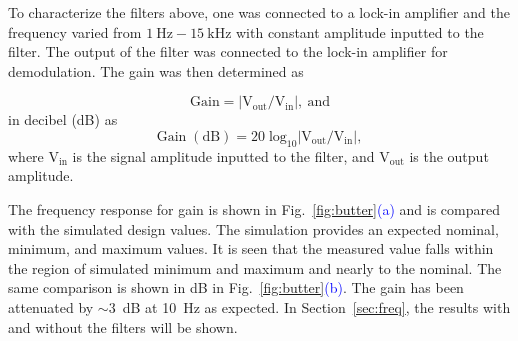 To characterize the filters above, one was connected to a lock-in amplifier and the frequency varied from $\mathrm{1~Hz-15~kHz}$ with constant amplitude inputted to the filter. The output of the filter was connected to the lock-in amplifier for demodulation. The gain was then determined as 

\begin{equation}\label{eq:filter_gain}
    \mathrm{Gain=|V_{out}/V_{in}|,~and}
\end{equation}
in decibel (dB) as
\begin{equation}\label{eq:filter_gain_db}
    \mathrm{Gain\;(dB)=20\;log_{10}|V_{out}/V_{in}|,}
\end{equation}
where $\mathrm{V_{in}}$ is the signal amplitude inputted to the filter, and $\mathrm{V_{out}}$ is the output amplitude.


The frequency response for gain is shown in Fig.~\ref{fig:butter}\textcolor{blue}{(a)} and is compared with the simulated design values. The simulation provides an expected nominal, minimum, and maximum values. It is seen that the measured value falls within the region of simulated minimum and maximum and nearly to the nominal. The same comparison is shown in dB in Fig.~\ref{fig:butter}\textcolor{blue}{(b)}. The gain has been attenuated by $\sim3$~dB at 10~Hz as expected. In Section~\ref{sec:freq}, the results with and without the filters will be shown. 








